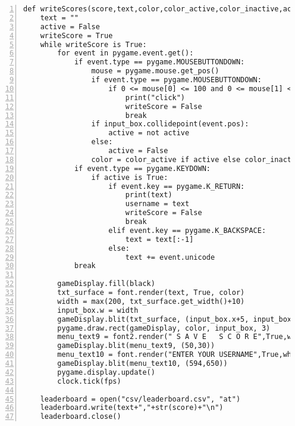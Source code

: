 \documentclass[12pt]{report}
\begin{document}
\tiny
\begin{Verbatim}[numbers=left, frame=single]
def writeScores(score,text,color,color_active,color_inactive,active):
    text = ""
    active = False
    writeScore = True
    while writeScore is True:
        for event in pygame.event.get():
            if event.type == pygame.MOUSEBUTTONDOWN:
                mouse = pygame.mouse.get_pos()
                if event.type == pygame.MOUSEBUTTONDOWN:
                    if 0 <= mouse[0] <= 100 and 0 <= mouse[1] <= 100:
                        print("click")
                        writeScore = False
                        break
                if input_box.collidepoint(event.pos):
                    active = not active
                else:
                    active = False
                color = color_active if active else color_inactive
            if event.type == pygame.KEYDOWN:
                if active is True:
                    if event.key == pygame.K_RETURN:
                        print(text)
                        username = text
                        writeScore = False
                        break
                    elif event.key == pygame.K_BACKSPACE:
                        text = text[:-1]
                    else:
                        text += event.unicode
            break
        
        gameDisplay.fill(black)
        txt_surface = font.render(text, True, color)                                         
        width = max(200, txt_surface.get_width()+10)                                      .
        input_box.w = width
        gameDisplay.blit(txt_surface, (input_box.x+5, input_box.y+5))                   
        pygame.draw.rect(gameDisplay, color, input_box, 3)
        menu_text9 = font2.render(" S A V E   S C O R E",True,white)
        gameDisplay.blit(menu_text9, (50,30))
        menu_text10 = font.render("ENTER YOUR USERNAME",True,white)
        gameDisplay.blit(menu_text10, (594,650))
        pygame.display.update()                                                                 
        clock.tick(fps)
    
    leaderboard = open("csv/leaderboard.csv", "at")
    leaderboard.write(text+","+str(score)+"\n")
    leaderboard.close()
\end{Verbatim}

\pagebreak

\normalsize
\end{document}
